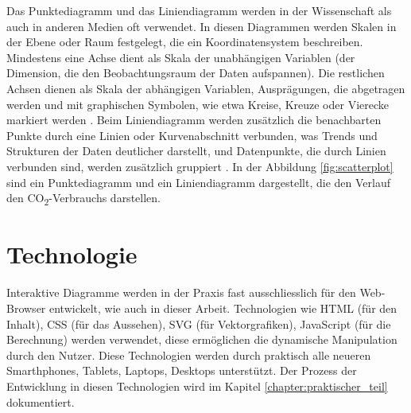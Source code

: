 Das Punktediagramm und das Liniendiagramm werden in der Wissenschaft als auch in anderen Medien oft verwendet. In diesen Diagrammen werden Skalen in der Ebene oder Raum festgelegt, die ein Koordinatensystem beschreiben. Mindestens eine Achse dient als Skala der unabhängigen Variablen (der Dimension, die den Beobachtungsraum der Daten aufspannen). Die restlichen Achsen dienen als Skala der abhängigen Variablen, Ausprägungen, die abgetragen werden und mit graphischen Symbolen, wie etwa Kreise, Kreuze oder Vierecke markiert werden \cite{viz}. Beim Liniendiagramm werden zusätzlich die benachbarten Punkte durch eine Linien oder Kurvenabschnitt verbunden, was Trends und Strukturen der Daten deutlicher darstellt, und Datenpunkte, die durch Linien verbunden sind, werden zusätzlich gruppiert \cite{interpolation_wirkung}. In der Abbildung \ref{fig:scatterplot} sind ein Punktediagramm und ein Liniendiagramm dargestellt, die den Verlauf den CO\textsubscript{2}-Verbrauchs darstellen.


\section{Technologie}

Interaktive Diagramme werden in der Praxis fast ausschliesslich für den Web-Browser entwickelt, wie auch in dieser Arbeit. Technologien wie HTML (für den Inhalt), CSS (für das Aussehen), SVG (für Vektorgrafiken), JavaScript (für die Berechnung) werden verwendet, diese ermöglichen die dynamische Manipulation durch den Nutzer. Diese Technologien werden durch praktisch alle neueren Smarthphones, Tablets, Laptops, Desktops unterstützt. Der Prozess der Entwicklung in diesen Technologien wird im Kapitel \ref{chapter:praktischer_teil} dokumentiert.
